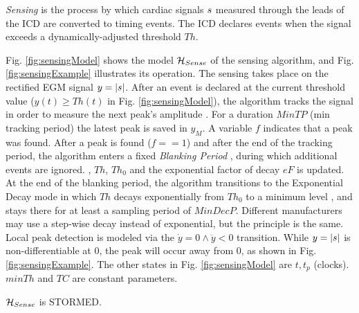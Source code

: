 \emph{Sensing} is the process by which cardiac signals $s$ measured through the leads of the \ac{ICD} are converted to timing events.
The \ac{ICD} declares events when the signal exceeds a dynamically-adjusted threshold $Th$.

Fig. \ref{fig:sensingModel} shows the model $\mathcal{H}_{Sense}$ of the sensing algorithm, and Fig. \ref{fig:sensingExample} illustrates its operation. 
The sensing takes place on the rectified \ac{EGM} signal $y = |s|$.
After an event is declared at the current threshold value ($y(t)\geq Th(t)$ in Fig. \ref{fig:sensingModel}), the algorithm tracks the signal in order to measure the next peak's amplitude .
For a duration $MinTP$ (min tracking period) the latest peak is saved in $y_M$.
A variable $f$ indicates that a peak was found.
After a peak is found ($f==1$) and after the end of the tracking period, the algorithm enters a fixed \emph{Blanking Period} , during which additional events are ignored.
, $Th$, $Th_0$ and the exponential factor of decay $eF$ is updated. 
At the end of the blanking period, the algorithm transitions to the Exponential Decay mode in which $Th$ decays exponentially from $Th_0$ to a minimum level , and stays there for at least a sampling period of $MinDecP$.
Different manufacturers may use a step-wise decay instead of exponential, but the principle is the same.
%
Local peak detection is modeled via the $\dot{y} = 0 \wedge \ddot{y}<0$ transition.
While $y=|s|$ is non-differentiable at 0, the peak will occur away from 0, as shown in Fig. \ref{fig:sensingExample}.
The other states in Fig. \ref{fig:sensingModel} are $t, t_p$ (clocks).
$minTh$ and $TC$ are constant parameters.
\begin{thm}
	\label{thm:sensing}
	$\mathcal{H}_{Sense}$ is STORMED.	
\end{thm}
